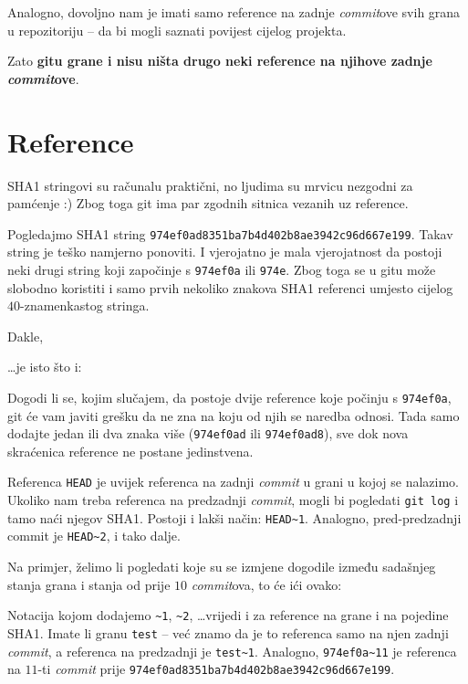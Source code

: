 Analogno, dovoljno nam je imati samo reference na zadnje \emph{commit}ove svih grana u repozitoriju -- da bi mogli saznati povijest cijelog projekta.

Zato \textbf{gitu grane i nisu ništa drugo neki reference na njihove zadnje \emph{commit}ove}.

\section*{Reference}

SHA1 stringovi su računalu praktični, no ljudima su mrvicu nezgodni za pamćenje :)
Zbog toga git ima par zgodnih sitnica vezanih uz reference.

Pogledajmo SHA1 string \verb+974ef0ad8351ba7b4d402b8ae3942c96d667e199+.
Takav string je teško namjerno ponoviti. I vjerojatno je mala vjerojatnost da postoji neki drugi string koji započinje s \verb+974ef0a+ ili \verb+974e+.
Zbog toga se u gitu može slobodno koristiti i samo prvih nekoliko znakova SHA1 referenci umjesto cijelog $40$-znamenkastog stringa.

Dakle, 


\dots{}je isto što i:


Dogodi li se, kojim slučajem, da postoje dvije reference koje počinju s \verb+974ef0a+, git će vam javiti grešku da ne zna na koju od njih se naredba odnosi.
Tada samo dodajte jedan ili dva znaka više (\verb+974ef0ad+ ili \verb+974ef0ad8+), sve dok nova skraćenica reference ne postane jedinstvena.

Referenca \verb+HEAD+ je uvijek referenca na zadnji \emph{commit} u grani u kojoj se nalazimo.
Ukoliko nam treba referenca na predzadnji \emph{commit}, mogli bi pogledati \verb+git log+ i tamo naći njegov SHA1.
Postoji i lakši način: \verb+HEAD~1+.
Analogno, pred-predzadnji commit je \verb+HEAD~2+, i tako dalje.

Na primjer, želimo li pogledati koje su se izmjene dogodile između sadašnjeg stanja grana i stanja od prije $10$ \emph{commit}ova, to će ići ovako:


Notacija kojom dodajemo \verb+~1+, \verb+~2+, \dots vrijedi i za reference na grane i na pojedine SHA1.
Imate li granu \verb+test+ -- već znamo da je to referenca samo na njen zadnji \emph{commit}, a referenca na predzadnji je \verb+test~1+.
Analogno, \verb+974ef0a~11+ je referenca na $11$-ti \emph{commit} prije \verb+974ef0ad8351ba7b4d402b8ae3942c96d667e199+.

